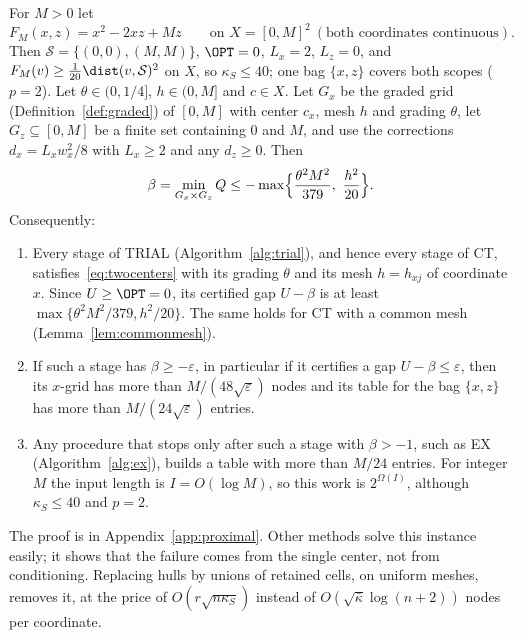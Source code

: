 \begin{proposition}
\label{prop:twocenters}
For $M>0$ let
\[
F_M(x,z)=x^2-2xz+Mz\qquad\text{on }X=[0,M]^2\ (\text{both coordinates
continuous}).
\]
Then $\mathcal S=\{(0,0),(M,M)\}$, $\OPT=0$, $L_x=2$, $L_z=0$, and
$F_M(v)\ge\frac1{20}\dist(v,\mathcal S)^2$ on $X$, so $\kappa_S\le40$; one bag
$\{x,z\}$ covers both scopes ($p=2$). Let $\theta\in(0,1/4]$, $h\in(0,M]$ and
$c\in X$. Let $G_x$ be the graded grid (Definition~\ref{def:graded}) of
$[0,M]$ with center $c_x$, mesh $h$ and grading $\theta$, let $G_z\subseteq[0,M]$ be a finite set containing $0$
and $M$, and use the corrections $d_x=L_xw_x^2/8$ with $L_x\ge2$ and any
$d_z\ge0$. Then
\begin{equation}\label{eq:twocenters}
\beta=\min_{G_x\times G_z}Q\le-\max\Bigl\{\frac{\theta^2M^2}{379},\
\frac{h^2}{20}\Bigr\}.
\end{equation}
Consequently:
\begin{enumerate}[label=(\alph*)]
\item Every stage of TRIAL (Algorithm~\ref{alg:trial}), and hence every stage
of CT, satisfies~\eqref{eq:twocenters} with its grading $\theta$ and its mesh
$h=h_{xj}$ of coordinate $x$. Since $U\ge\OPT=0$, its certified gap $U-\beta$
is at least $\max\{\theta^2M^2/379,h^2/20\}$. The same holds for CT with a
common mesh (Lemma~\ref{lem:commonmesh}).
\item If such a stage has $\beta\ge-\varepsilon$, in particular if it
certifies a gap $U-\beta\le\varepsilon$, then its $x$-grid has more than
$M/(48\sqrt\varepsilon)$ nodes and its table for the bag $\{x,z\}$ has more
than $M/(24\sqrt\varepsilon)$ entries.
\item Any procedure that stops only after such a stage with $\beta>-1$, such
as EX (Algorithm~\ref{alg:ex}), builds a table with more than $M/24$ entries.
For integer $M$ the input length is $I=O(\log M)$, so this work is
$2^{\Omega(I)}$, although $\kappa_S\le40$ and $p=2$.
\end{enumerate}
\end{proposition}

The proof is in Appendix~\ref{app:proximal}. Other methods solve this
instance easily; it shows that the failure comes from the single center, not
from conditioning. Replacing hulls by unions of
retained cells, on uniform meshes, removes it, at the price of
$O(r\sqrt{n\kappa_S})$ instead of $O(\sqrt{\bar\kappa}\log(n+2))$ nodes per
coordinate.

